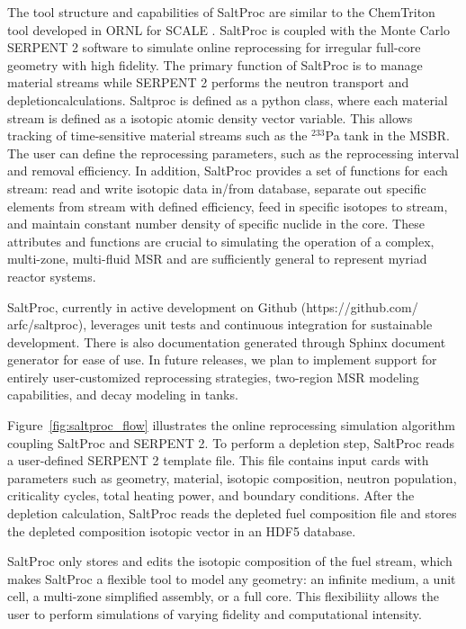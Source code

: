 The tool structure and capabilities of SaltProc are similar to the ChemTriton tool 
developed in \gls{ORNL} for SCALE \cite{powers_new_2013}. SaltProc is coupled 
with the Monte Carlo SERPENT 2
software to simulate online reprocessing for irregular full-core 
geometry with high fidelity.  The primary function of SaltProc is to 
manage material streams while SERPENT 2 performs the neutron 
transport and depletioncalculations. Saltproc is defined as a python class, where 
each material stream is defined as a isotopic atomic density
vector variable. This allows tracking of time-sensitive material streams such 
as the 	$^{233}$Pa tank in the \gls{MSBR}. The user can define the reprocessing 
parameters, such as the reprocessing interval and removal efficiency.  In 
addition, SaltProc provides a set of functions for each stream: read and write 
isotopic data in/from database, separate out specific elements from stream with 
defined efficiency, feed in specific isotopes to stream, and maintain constant 
number density of specific nuclide in the core. These attributes and functions 
are crucial to simulating the operation of a complex, multi-zone, multi-fluid 
\gls{MSR} and are sufficiently general to represent myriad reactor systems.

SaltProc, currently in active development on Github (https://github.com/ 
arfc/saltproc), leverages unit tests and continuous integration for 
sustainable development. There is also documentation
generated through Sphinx document generator for ease of use. In future 
releases, we plan to 
implement
support for entirely user-customized reprocessing strategies, two-region \gls{MSR} modeling 
capabilities, and decay modeling in tanks.

Figure~\ref{fig:saltproc_flow} illustrates the  online reprocessing simulation 
algorithm coupling SaltProc and SERPENT 2. To perform a depletion step, 
SaltProc reads a user-defined SERPENT 2 template file. This file contains input 
cards with parameters such as geometry, material, isotopic composition, neutron 
population, criticality cycles, total heating power, and boundary conditions.  
After the depletion calculation, SaltProc reads the depleted fuel composition 
file and stores the depleted composition isotopic vector in 
an HDF5 database. 

SaltProc only stores and edits the isotopic composition of 
the fuel stream, which makes SaltProc a flexible tool to model any geometry: an 
infinite medium, a unit cell, a multi-zone simplified assembly, or a full core.
This flexibiliity allows the user to perform simulations of varying fidelity 
and computational intensity.

